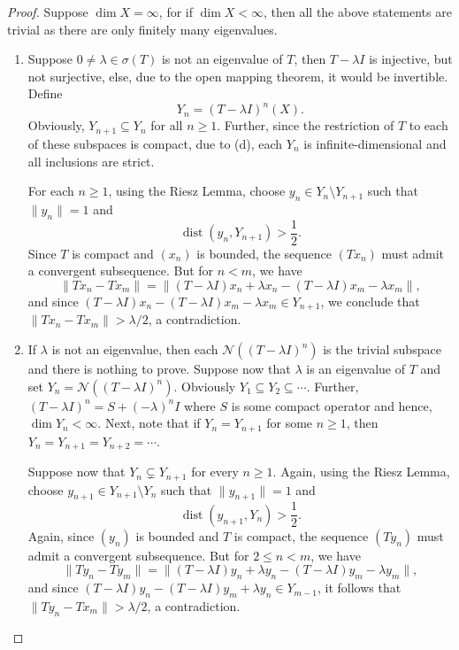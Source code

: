 \documentclass[12pt]{article}
\theoremstyle{thmstyle}
\theoremstyle{defstyle}
\newcommand{\scrN}{\mathscr N}
\renewcommand{\le}{\leqslant}
\renewcommand{\ge}{\geqslant}
\begin{document}
\begin{proof}
    Suppose $\dim X = \infty$, for if $\dim X < \infty$, then all the above statements are trivial as there are only finitely many eigenvalues.
\begin{enumerate}[label=(\alph*)]
    \item Suppose $0\ne\lambda\in\sigma(T)$ is not an eigenvalue of $T$, then $T - \lambda I$ is injective, but not surjective, else, due to the open mapping theorem, it would be invertible. Define 
    \begin{equation*}
        Y_n = (T - \lambda I)^{n}(X).
    \end{equation*}
    Obviously, $Y_{n + 1}\subseteq Y_n$ for all $n\ge 1$. Further, since the restriction of $T$ to each of these subspaces is compact, due to  (d), each $Y_n$ is infinite-dimensional and all inclusions are strict.

    For each $n\ge 1$, using the Riesz Lemma, choose $y_n\in Y_n\setminus Y_{n + 1}$ such that $\|y_n\| = 1$ and 
    \begin{equation*}
        \operatorname{dist}(y_n, Y_{n + 1}) > \frac{1}{2}.
    \end{equation*}
    Since $T$ is compact and $(x_n)$ is bounded, the sequence $(Tx_n)$ must admit a convergent subsequence. But for $n < m$, we have 
    \begin{equation*}
        \|Tx_n - Tx_m\| = \|(T - \lambda I)x_n + \lambda x_n - (T - \lambda I)x_m - \lambda x_m\|,
    \end{equation*}
    and since $(T - \lambda I)x_n - (T - \lambda I)x_m - \lambda x_m\in Y_{n + 1}$, we conclude that $\|Tx_n - Tx_m\| > \lambda/2$, a contradiction.

    \item If $\lambda$ is not an eigenvalue, then each $\scrN((T - \lambda I)^n)$ is the trivial subspace and there is nothing to prove. Suppose now that $\lambda$ is an eigenvalue of $T$ and set $Y_n = \scrN((T - \lambda I)^n)$. Obviously $Y_1\subseteq Y_2\subseteq\cdots$. Further, $(T - \lambda I)^n = S + (-\lambda)^nI$ where $S$ is some compact operator and hence, $\dim Y_n < \infty$. Next, note that if $Y_n = Y_{n + 1}$ for some $n\ge 1$, then $Y_n = Y_{n + 1} = Y_{n + 2} = \cdots$.

    Suppose now that $Y_n\subsetneq Y_{n + 1}$ for every $n\ge 1$. Again, using the Riesz Lemma, choose $y_{n + 1}\in Y_{n + 1}\setminus Y_n$ such that $\|y_{n + 1}\| = 1$ and 
    \begin{equation*}
        \operatorname{dist}(y_{n + 1}, Y_{n}) > \frac{1}{2}.
    \end{equation*}
    Again, since $(y_n)$ is bounded and $T$ is compact, the sequence $(Ty_n)$ must admit a convergent subsequence. But for $2\le n < m$, we have 
    \begin{equation*}
        \|Ty_n - Ty_m\| = \|(T - \lambda I)y_n + \lambda y_n - (T - \lambda I)y_m - \lambda y_m\|,
    \end{equation*}
    and since $(T - \lambda I)y_n - (T - \lambda I)y_{m} + \lambda y_n\in Y_{m - 1}$, it follows that $\|Ty_n - Tx_m\| > \lambda/2$, a contradiction.


\end{enumerate}
\end{proof}
\end{document}
